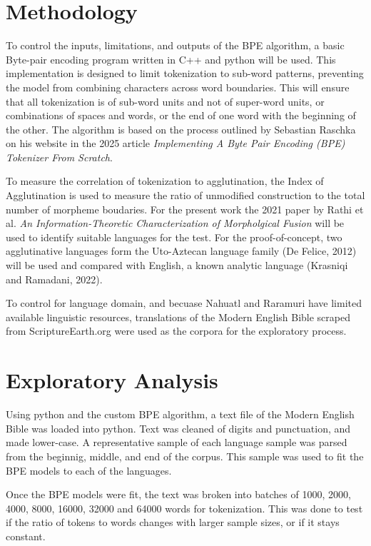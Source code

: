 \documentclass[11pt]{article}
\begin{document}
\section{Methodology}
To control the inputs, limitations, and outputs of the BPE algorithm, a basic Byte-pair encoding program written in C++ and python will be used. This implementation is designed to limit tokenization to sub-word patterns, preventing the model from combining characters across word boundaries. This will ensure that all tokenization is of sub-word units and not of super-word units, or combinations of spaces and words, or the end of one word with the beginning of the other. The algorithm is based on the process outlined by Sebastian Raschka on his website in the 2025 article \textit{Implementing A Byte Pair Encoding (BPE) Tokenizer From Scratch}. 

To measure the correlation of tokenization to agglutination, the Index of Agglutination is used to measure the ratio of unmodified construction to the total number of morpheme boudaries. For the present work the 2021 paper by Rathi et al. \textit{An Information-Theoretic Characterization of Morpholgical Fusion} will be used to identify suitable languages for the test. For the proof-of-concept, two agglutinative languages form the Uto-Aztecan language family (De Felice, 2012) will be used and compared with English, a known analytic language (Krasniqi and Ramadani, 2022). 

To control for language domain, and becuase Nahuatl and Raramuri have limited available linguistic resources, translations of the Modern English Bible scraped from ScriptureEarth.org were used as the corpora for the exploratory process. 


\section{Exploratory Analysis} 

Using python and the custom BPE algorithm, a text file of the Modern English Bible was loaded into python. Text was cleaned of digits and punctuation, and made lower-case. A representative sample of each language sample was parsed from the beginnig, middle, and end of the corpus. This sample was used to fit the BPE models to each of the languages. 

Once the BPE models were fit, the text was broken into batches of 1000, 2000, 4000, 8000, 16000, 32000 and 64000 words for tokenization. This was done to test if the ratio of tokens to words changes with larger sample sizes, or if it stays constant.
\end{document}
